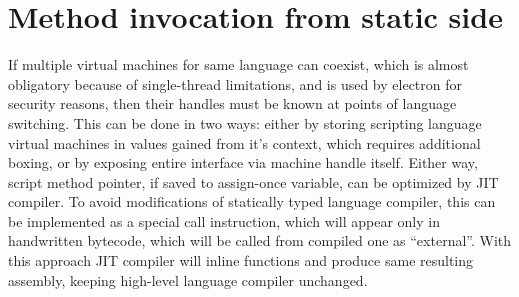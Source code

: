 \documentclass[times, %
               specification,annotation, %
               titlepage-extra-ru,specification-extra-ru,annotation-extra-ru, %
               languages={russian,english} %
              ]{itmo-student-thesis}
\begin{document}
\section{Method invocation from static side}
If multiple virtual machines for same language can coexist, which is almost obligatory because of single-thread limitations, and is used by electron for security reasons, then their handles must be known at points of language switching. This can be done in two ways: either by storing scripting language virtual machines in values gained from it's context, which requires additional boxing, or by exposing entire interface via machine handle itself. Either way, script method pointer, if saved to assign-once variable, can be optimized by JIT compiler. To avoid modifications of statically typed language compiler, this can be implemented as a special call instruction, which will appear only in handwritten bytecode, which will be called from compiled one as ``external''. With this approach JIT compiler will inline functions and produce same resulting assembly, keeping high-level language compiler unchanged.
\end{document}
